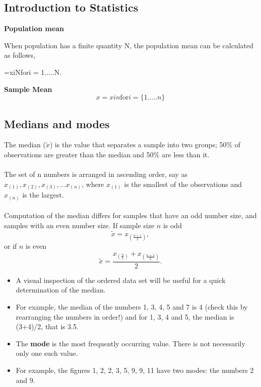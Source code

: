 \documentclass[]{report}
\begin{document}
\subsection{Introduction to Statistics}

\textbf{Population mean}


When population has a finite quantity N, the population mean can be calculated as follows,

=xiNfori = 1.....N.




\textbf{Sample Mean}
\[x=xin    \mbox{for} i = \{1.....n\} \] 








\subsection{Medians and modes}
The median ($\tilde{x}$) is the value that separates a sample into two groups; 50\% of observations are greater
than the median and 50\% are less than it.
\\ \\\noindent The set of n numbers is arranged in ascending order, say as $x_(1), x_(2), x_(3), \dots x_(n)$, where $x_(1)$ is the smallest of the observations and $x_(n)$ is the largest.
\\ \\\noindent Computation of the median differs for samples that have an odd number size, and samples with an even number size. If sample size $n$ is odd
\[ \tilde{x} =  x_{(\frac{n+1}{2})} ,\]
or if $n$ is even 
\[ \tilde{x} =  \frac{  x_{(\frac{n}{2})}  + x_{(\frac{n+1}{2})} }{2}. \]



\begin{itemize}
\item A visual inspection of the ordered data set will be useful for a quick determination of the median.
\item For example, the median of the numbers 1, 3, 4, 5 and 7 is 4 (check this by
rearranging the numbers in order!) and for 1, 3, 4 and 5, the median is (3+4)/2, that is
3.5.
\item The \textbf{mode} is the most frequently occurring value. There is not necessarily only one
such value. 
\item For example, the figures 1, 2, 2, 3, 5, 9, 9, 11 have two modes: the
numbers 2 and 9.
\end{itemize}
\end{document}
